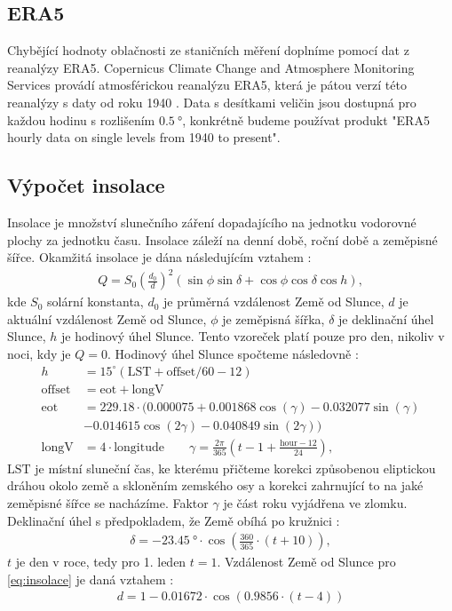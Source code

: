 \subsection{ERA5}\label{chap:era5}
Chybějící hodnoty oblačnosti ze staničních měření doplníme pomocí dat z reanalýzy ERA5. Copernicus Climate Change and Atmosphere Monitoring Services provádí atmosférickou reanalýzu ERA5, která je pátou verzí této reanalýzy s daty od roku 1940 \parencite{era5}. Data s desítkami veličin jsou dostupná pro každou hodinu s rozlišením $\SI{0.5}{\degree}$, konkrétně budeme používat produkt "ERA5 hourly data on single levels from 1940 to present".

\subsection{Výpočet insolace}\label{chap:insolation}
Insolace je množství slunečního záření dopadajícího na jednotku vodorovné plochy za jednotku času. Insolace záleží na denní době, roční době a zeměpisné šířce. Okamžitá insolace je dána následujícím vztahem \parencite{insolace}:
\begin{gather}\label{eq:insolace}
Q = S_0\left(\frac{d_0}{d}\right)^2\left(\sin\phi\sin\delta + \cos\phi\cos\delta\cos h\right),
\end{gather}
kde $S_0$ solární konstanta, $d_0$ je průměrná vzdálenost Země od Slunce, $d$ je aktuální vzdálenost Země od Slunce, $\phi$ je zeměpisná šířka, $\delta$ je deklinační úhel Slunce, $h$ je hodinový úhel Slunce. Tento vzoreček platí pouze pro den, nikoliv v noci, kdy je $Q=0$. Hodinový úhel Slunce spočteme následovně \parencite{hourangle}:
\begin{equation}
	\begin{split}
		h &= 15^{\circ}\left(\text{LST}+\text{offset}/60-12\right)\\
		\text{offset} &= \text{eot} + \text{longV}\\
		\text{eot} &= 229.18\cdot(0.000075+0.001868\cos(\gamma)-0.032077\sin(\gamma)\\
		& -0.014615\cos(2\gamma)-0.040849\sin(2\gamma))\\
		\text{longV} &= 4\cdot\text{longitude}\qquad \gamma = \frac{2\pi}{365}\left(t - 1 + \frac{\text{hour}-12}{24}\right),
	\end{split}
\end{equation}
$\text{LST}$ je místní sluneční čas, ke kterému přičteme korekci způsobenou eliptickou dráhou okolo země a skloněním zemského osy a korekci zahrnující to na jaké zeměpisné šířce se nacházíme. Faktor $\gamma$ je část roku vyjádřena ve zlomku.
Deklinační úhel s předpokladem, že Země obíhá po kružnici \parencite{declinationangle}:
\begin{gather*}
\delta = \SI{-23.45}{\degree} \cdot \cos\left(\frac{360}{365}\cdot(t+10)\right),
\end{gather*}
$t$ je den v roce, tedy pro 1. leden $t=1$. Vzdálenost Země od Slunce pro \eqref{eq:insolace} je daná vztahem \parencite{sunearthdist}:
\begin{gather*}
d = 1-0.01672\cdot \cos\left(0.9856\cdot(t-4)\right)
\end{gather*}


